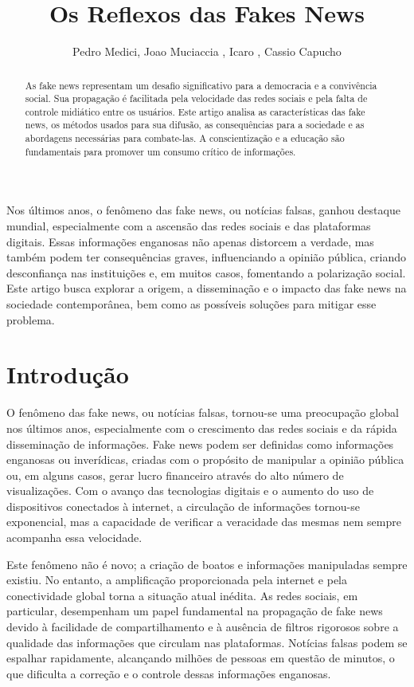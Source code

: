 \documentclass[12pt]{article}
\title{\textbf{Os Reflexos das Fakes News} }
\author{Pedro Medici, Joao Muciaccia , Icaro \inst, Cassio Capucho}
\begin{document}
 

\maketitle

\begin{abstract}
As fake news representam um desafio significativo para a democracia e a convivência social. Sua propagação é facilitada pela velocidade das redes sociais e pela falta de controle midiático entre os usuários. Este artigo analisa as características das fake news, os métodos usados para sua difusão, as consequências para a sociedade e as abordagens necessárias para combate-las. A conscientização e a educação são fundamentais para promover um consumo crítico de informações. 
\end{abstract}
     
\begin{resumo} 
Nos últimos anos, o fenômeno das fake news, ou notícias falsas, ganhou destaque mundial, especialmente com a ascensão das redes sociais e das plataformas digitais. Essas informações enganosas não apenas distorcem a verdade, mas também podem ter consequências graves, influenciando a opinião pública, criando desconfiança nas instituições e, em muitos casos, fomentando a polarização social. Este artigo busca explorar a origem, a disseminação e o impacto das fake news na sociedade contemporânea, bem como as possíveis soluções para mitigar esse problema. 
\end{resumo}

\section{Introdução}

O fenômeno das fake news, ou notícias falsas, tornou-se uma preocupação global nos últimos anos, especialmente com o crescimento das redes sociais e da rápida disseminação de informações. Fake news podem ser definidas como informações enganosas ou inverídicas, criadas com o propósito de manipular a opinião pública ou, em alguns casos, gerar lucro financeiro através do alto número de visualizações. Com o avanço das tecnologias digitais e o aumento do uso de dispositivos conectados à internet, a circulação de informações tornou-se exponencial, mas a capacidade de verificar a veracidade das mesmas nem sempre acompanha essa velocidade.

Este fenômeno não é novo; a criação de boatos e informações manipuladas sempre existiu. No entanto, a amplificação proporcionada pela internet e pela conectividade global torna a situação atual inédita. As redes sociais, em particular, desempenham um papel fundamental na propagação de fake news devido à facilidade de compartilhamento e à ausência de filtros rigorosos sobre a qualidade das informações que circulam nas plataformas. Notícias falsas podem se espalhar rapidamente, alcançando milhões de pessoas em questão de minutos, o que dificulta a correção e o controle dessas informações enganosas.
\end{document}

